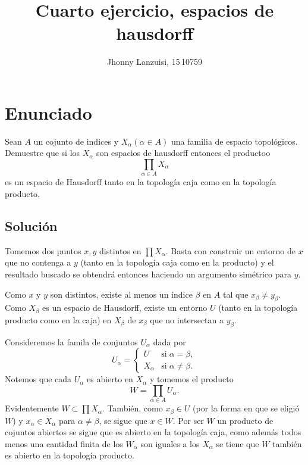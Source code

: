 \documentclass[fleqn,leqno,letterpaper,10pt,final]{article}
\title{Cuarto ejercicio, espacios de hausdorff}
\author{Jhonny Lanzuisi, 15\,10759}
\begin{document}
\maketitle
\tableofcontents
{}

\section[Enunciado]{Enunciado}
Sean $A$ un cojunto de indices y $X_{\alpha} (\alpha\in A)$ una familia de espacio topológicos.
Demuestre que si los $X_{\alpha}$ son espacios de hausdorff
entonces el productoo
\[
	\prod_{\alpha\in A} X_{\alpha}
\]
es un espacio de Hausdorff tanto en la topología caja como en la topología producto.

\subsection{Solución}
Tomemos dos puntos $x,y$ distintos en $\prod X_{\alpha}$. Basta con construir
un entorno de $x$ que no contenga a $y$ (tanto en la topología caja como en la producto)
y el resultado buscado se obtendrá entonces haciendo un argumento simétrico para $y$.

Como $x$ y $y$ son distintos,
existe al menos un índice $\beta$ en $A$ tal que $x_{\beta}\neq y_{\beta}$.
Como $X_{\beta}$ es un espacio de Hausdorff, existe  un entorno $U$
(tanto en la topología producto como en la caja)
 en $X_{\beta}$ de $x_{\beta}$ que no intersectan a $y_{\beta}$.

Consideremos la famila de conjuntos $U_\alpha$ dada por
\[
	U_{\alpha}=
		\begin{cases}
			U &\text{si}\;\alpha=\beta,\\
			X_\alpha &\text{si}\;\alpha\neq \beta.
		\end{cases}
\]
Notemos que cada $U_\alpha$ es abierto en $X_\alpha$ y tomemos el producto
\[
	W=\prod_{\alpha\in A} U_\alpha.
\]
Evidentemente $W\subset\prod X_{\alpha}$. También, como $x_{\beta}\in U$ 
(por la forma en que se eligió $W$) y $x_\alpha\in X_{\alpha}$ para
$\alpha\neq\beta$, se sigue que $x\in W$. Por ser $W$ un producto
de cojuntos abiertos se sigue que es abierto en la topología
caja, como además todos menos una cantidad finita de los 
$W_\alpha$ son iguales a los $X_\alpha$ se tiene que $W$ también
es abierto en la topología producto.
\end{document}
